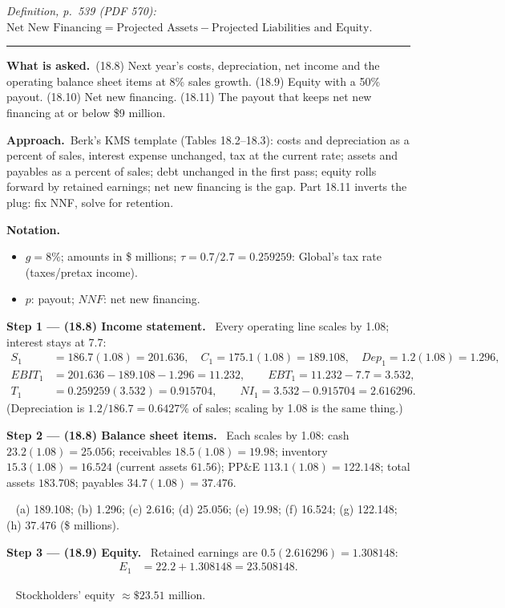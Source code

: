 \documentclass[11pt,a4paper]{article}
\newcommand{\notation}{\par\noindent\textbf{Notation.}}
\newcommand{\step}[2]{\par\medskip\noindent\textbf{Step #1 --- #2.}~}
\newcommand{\asked}{\par\medskip\noindent\textbf{What is asked.}~}
\newcommand{\approach}{\par\smallskip\noindent\textbf{Approach.}~}
\newcommand{\answer}[1]{\par\smallskip\noindent\fbox{\textbf{Answer #1.}}~}
\newcommand{\stmtend}{\par\endgroup\nopagebreak\noindent\rule{\linewidth}{0.4pt}\par\medskip}
\begin{document}
\emph{Definition, p.~539 (PDF 570):}
\(\text{Net New Financing} = \text{Projected Assets} - \text{Projected Liabilities and Equity}\).
\stmtend

\asked (18.8) Next year's costs, depreciation, net income and the operating balance sheet items at 8\%
sales growth. (18.9) Equity with a 50\% payout. (18.10) Net new financing. (18.11) The payout that keeps
net new financing at or below \$9 million.

\approach Berk's KMS template (Tables 18.2--18.3): costs and depreciation as a percent of sales,
interest expense unchanged, tax at the current rate; assets and payables as a percent of sales; debt
unchanged in the first pass; equity rolls forward by retained earnings; net new financing is the gap.
Part 18.11 inverts the plug: fix NNF, solve for retention.

\notation
\begin{itemize}
  \item $g=8\%$; amounts in \$ millions; $\tau=0.7/2.7=0.259259$: Global's tax rate (taxes/pretax income).
  \item $p$: payout; $NNF$: net new financing.
\end{itemize}

\step{1}{(18.8) Income statement} Every operating line scales by 1.08; interest stays at 7.7:
\begin{align}
  S_1 &= 186.7(1.08) = 201.636, \quad C_1 = 175.1(1.08) = 189.108, \quad Dep_1 = 1.2(1.08) = 1.296, \nonumber\\
  EBIT_1 &= 201.636-189.108-1.296 = 11.232, \qquad EBT_1 = 11.232-7.7 = 3.532, \nonumber\\
  T_1 &= 0.259259(3.532) = 0.915704, \qquad NI_1 = 3.532-0.915704 = 2.616296. \label{r2ce8-ni}
\end{align}
(Depreciation is $1.2/186.7=0.6427\%$ of sales; scaling by 1.08 is the same thing.)

\step{2}{(18.8) Balance sheet items} Each scales by 1.08: cash $23.2(1.08)=25.056$; receivables
$18.5(1.08)=19.98$; inventory $15.3(1.08)=16.524$ (current assets $61.56$); PP\&E $113.1(1.08)=122.148$;
total assets $183.708$; payables $34.7(1.08)=37.476$.
\answer{(18.8)} (a) 189.108; (b) 1.296; (c) 2.616; (d) 25.056; (e) 19.98; (f) 16.524; (g) 122.148; (h) 37.476 (\$ millions).

\step{3}{(18.9) Equity} Retained earnings are $0.5(2.616296)=1.308148$:
\begin{align}
  E_1 &= 22.2+1.308148 = 23.508148. \label{r2ce8-eq}
\end{align}
\answer{(18.9)} Stockholders' equity $\approx\$23.51$ million.
\end{document}

